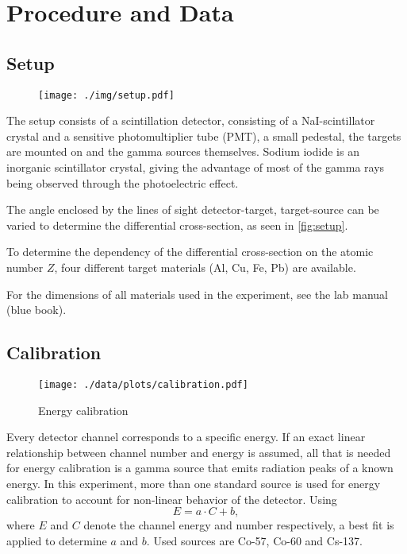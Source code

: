\chapter{Procedure and Data}

\section{Setup}
\begin{figure}
	\centering
	\texttt{[image: ./img/setup.pdf]}
	\label{fig:setup}
\end{figure}
The setup consists of a scintillation detector, consisting of a NaI-scintillator crystal and a sensitive photomultiplier tube (PMT), a small pedestal, the targets are mounted on and the gamma sources themselves.
Sodium iodide is an inorganic scintillator crystal, giving the advantage of most of the gamma rays being observed through the photoelectric effect.

The angle enclosed by the lines of sight detector-target, target-source can be varied to determine the differential cross-section, as seen in \autoref{fig:setup}.

To determine the dependency of the differential cross-section on the atomic number $Z$, four different target materials (Al, Cu, Fe, Pb) are available.

For the dimensions of all materials used in the experiment, see the lab manual (blue book).

\section{Calibration}
\begin{figure}
	\centering
	\texttt{[image: ./data/plots/calibration.pdf]}
	\caption{Energy calibration}
	\label{fig:calib}
\end{figure}
Every detector channel corresponds to a specific energy.
If an exact linear relationship between channel number and energy is assumed, all that is needed for energy calibration is a gamma source that emits radiation peaks of a known energy.
In this experiment, more than one standard source is used for energy calibration to account for non-linear behavior of the detector.
Using
\begin{equation*}
	E = a\cdot C + b,
\end{equation*}
where $E$ and $C$ denote the channel energy and number respectively, a best fit is applied to determine $a$ and $b$.
Used sources are Co-57, Co-60 and Cs-137.

